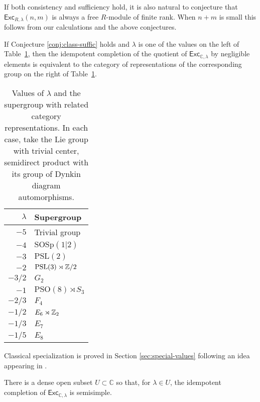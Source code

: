 \documentclass[12pt]{amsart}
\begin{document}
If both consistency and sufficiency hold, it is also natural to conjecture
that $\mathsf{Exc}_{R,\lambda}(n,m)$ is always a free $R$-module of finite
rank.  When $n+m$ is small this follows from our calculations and the above
conjectures.

\begin{proposition}
If Conjecture \ref{conj:class-suffic} holds and $\lambda$ is one of
the values on the left of Table~\ref{tab:lambda-group}, then the
idempotent completion of the quotient of
$\mathsf{Exc}_{\mathbb{C},\lambda}$ by negligible elements is equivalent
to the category of representations of the corresponding group on the
right of Table~\ref{tab:lambda-group}.
\end{proposition}

\begin{table}
  \begin{tabular}{rl}
    \toprule
    $\lambda$ & Supergroup  \\ \midrule
    $-5$ & Trivial group \\
    $-4$ & $\mathrm{SOSp}(1|2)$ \\
    $-3$ & $\mathrm{PSL}(2)$ \\
    $-2$ & $\mathrm{PSL}(3) \rtimes \mathbb Z/2$ \\
    $-3/2$ & $G_2$  \\
    $-1$ & $\mathrm{PSO}(8) \rtimes S_3$ \\
    $-2/3$ & $F_4$ \\
    $-1/2$ & $E_6 \rtimes \mathbb Z_2$\\
    $-1/3$ & $E_7$ \\
    $-1/5$ & $E_8$ \\
    \bottomrule
  \end{tabular}
  \caption{Values of $\lambda$ and the supergroup with related category
    representations. In each case, take the Lie group
    with trivial center, semidirect product with its group of Dynkin diagram
    automorphisms.    \label{tab:lambda-group}}
\end{table}

Classical specialization is proved in Section \ref{sec:special-values} following
an idea appearing in \cite{1709.01278}.


\begin{conjecture}\label{conj:class-semisimple}
There is a dense open subset $U \subset \mathbb{C}$ so that, for
$\lambda \in U$, the idempotent
completion of $\mathsf{Exc}_{\mathbb{C},\lambda}$ is
semisimple.
\end{conjecture}
\end{document}

